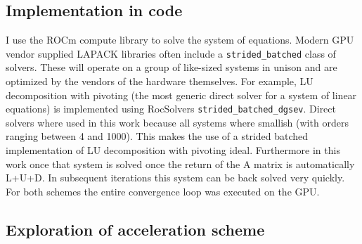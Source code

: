 

\subsection{Implementation in code}

I use the ROCm compute library to solve the system of equations.
Modern GPU vendor supplied LAPACK libraries often include a \texttt{strided\_batched} class of solvers.
These will operate on a group of like-sized systems in unison and are optimized by the vendors of the hardware themselves.
For example, LU decomposition with pivoting (the most generic direct solver for a system of linear equations) is implemented using RocSolvers \texttt{strided\_batched\_dgsev}.
Direct solvers where used in this work because all systems where smallish (with orders ranging between 4 and 1000).
This makes the use of a strided batched implementation of LU decomposition with pivoting ideal.
Furthermore in this work once that system is solved once the return of the A matrix is automatically L+U+D.
In subsequent iterations this system can be back solved very quickly.
For both schemes the entire convergence loop was executed on the GPU.

\subsection{Exploration of acceleration scheme}
\label{ssec:method_acc}

